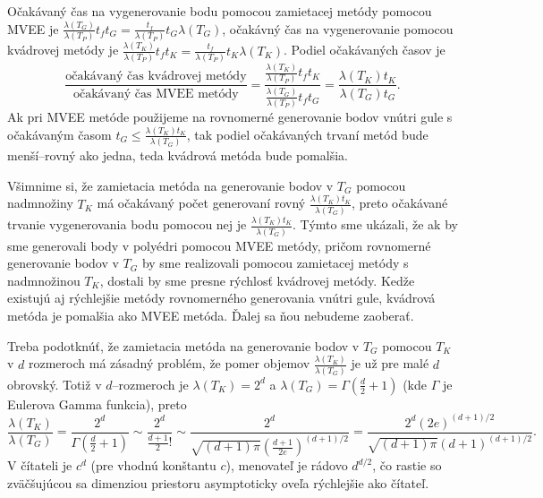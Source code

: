 Očakávaný čas na vygenerovanie bodu pomocou zamietacej metódy pomocou MVEE je $\frac{\lambda(T_G)}{\lambda(T_P)}t_ft_G=\frac{t_f}{\lambda(T_P)}t_G\lambda(T_G)$, očakávný čas na vygenerovanie pomocou kvádrovej metódy je $\frac{\lambda(T_K)}{\lambda(T_P)}t_ft_K=\frac{t_f}{\lambda(T_P)}t_K\lambda(T_K)$.
Podiel očakávaných časov je $$\frac{\text{očakávaný čas kvádrovej metódy}}{\text{očakávaný čas MVEE metódy}}=\frac{\frac{\lambda(T_K)}{\lambda(T_P)}t_ft_K}{\frac{\lambda(T_G)}{\lambda(T_P)}t_ft_G}=\frac{\lambda(T_K)t_K}{\lambda(T_G)t_G}.$$ Ak pri MVEE metóde použijeme na rovnomerné generovanie bodov vnútri gule s očakávaným časom $t_G \le \frac{\lambda(T_K)t_K}{\lambda(T_G)}$, tak podiel očakávaných trvaní metód bude menší--rovný ako jedna, teda kvádrová metóda bude pomalšia.

Všimnime si, že zamietacia metóda na generovanie bodov v $T_G$ pomocou nadmnožiny $T_K$ má očakávaný počet generovaní rovný $\frac{\lambda(T_K)t_K}{\lambda(T_G)}$, preto očakávané trvanie vygenerovania bodu pomocou nej je $\frac{\lambda(T_K)t_K}{\lambda(T_G)}$.
Týmto sme ukázali, že ak by sme generovali body v polyédri pomocou MVEE metódy, pričom rovnomerné generovanie bodov v $T_G$ by sme realizovali pomocou zamietacej metódy s nadmnožinou $T_K$, dostali by sme presne rýchlosť kvádrovej metódy. Kedže existujú aj rýchlejšie metódy rovnomerného generovania vnútri gule, kvádrová metóda je pomalšia ako MVEE metóda. Ďalej sa ňou nebudeme zaoberať.

Treba podotknúť, že zamietacia metóda na generovanie bodov v $T_G$ pomocou $T_K$ v $d$ rozmeroch má zásadný problém, že pomer objemov $\frac{\lambda(T_K)}{\lambda(T_G)}$ je už pre malé $d$ obrovský. Totiž v $d$--rozmeroch je $\lambda(T_K)=2^d$ a $\lambda(T_G)=\Gamma(\frac d 2 + 1)$ (kde $\Gamma$ je Eulerova Gamma funkcia), preto 
$$\frac{\lambda(T_K)}{\lambda(T_G)}=\frac{2^d}{\Gamma(\frac d 2 + 1)} \sim \frac{2^d}{\frac{d+1}{2}!}\sim \frac{2^{d}}{\sqrt{(d+1)\pi}(\frac{d+1}{2e})^{(d+1)/2}}=\frac{2^d (2e)^{(d+1)/2}}{\sqrt{(d+1)\pi}(d+1)^{(d+1)/2}}.$$
V čítateli je $c^d$ (pre vhodnú konštantu $c$), menovateľ je rádovo $d^{d/2}$, čo rastie so zväčšujúcou sa dimenziou priestoru asymptoticky oveľa rýchlejšie ako čítateľ.
